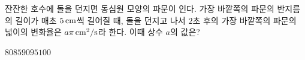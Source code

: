 잔잔한 호수에 돌을 던지면 동심원 모양의 파문이 인다. 가장 바깥쪽의 파문의 반지름의 길이가 매초 $5\mkern3mu \mathrm{cm}$씩 길어질 때, 돌을 던지고 나서 $2$초 후의 가장 바깥쪽의 파문의 넓이의 변화율은 $a\pi\mkern3mu \mathrm{cm}^2/\mathrm{s}$라 한다. 이때 상수 $a$의 값은?
\begin{choices32}{$80$}{$85$}{$90$}{$95$}{$100$}\end{choices32}
